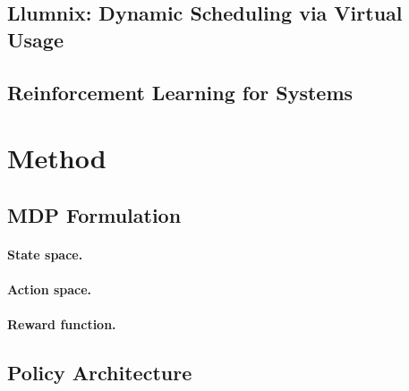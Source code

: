 \documentclass{article}
\begin{document}
\subsection{Llumnix: Dynamic Scheduling via Virtual Usage}

\subsection{Reinforcement Learning for Systems}

\section{Method}


\subsection{MDP Formulation}

\paragraph{State space.}

\paragraph{Action space.}

\paragraph{Reward function.}

\subsection{Policy Architecture}
\end{document}
